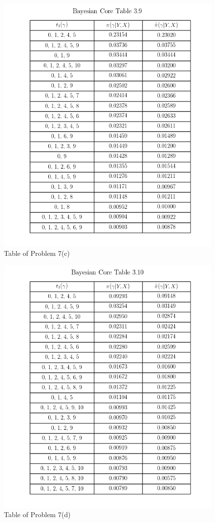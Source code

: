 \documentclass{article}
\begin{document}
\begin{figure}[ht]
\centering
\includegraphics[scale=0.6]{Table3_9.png}
\caption{Table of Problem 7(c)}
\end{figure}


\begin{figure}[ht]
\centering
\includegraphics[scale=0.6]{Table3_10.png}
\caption{Table of Problem 7(d)}
\end{figure}
\end{document}
